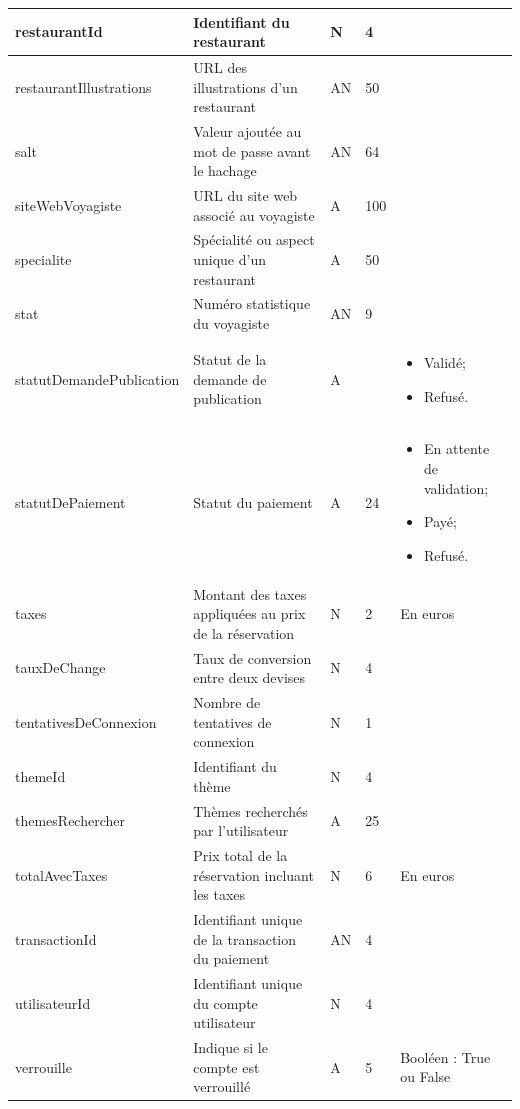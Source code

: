 \documentclass[12pt]{report}
\begin{document}
\begin{longtable}{|p{4cm}|p{4cm}|p{1cm}|p{1cm}|p{4cm}|}
				\hline
				restaurantId & Identifiant du restaurant & N & 4 & \\						
				\hline
				restaurantIllustrations & URL des illustrations d'un restaurant & AN & 50 & \\						
				\hline
				salt & Valeur ajoutée au mot de passe avant le hachage & AN & 64 & \\						
				\hline
				siteWebVoyagiste & URL du site web associé au voyagiste & A & 100 & \\						
				\hline
				specialite & Spécialité ou aspect unique d'un restaurant & A & 50 & \\						
				\hline
				stat & Numéro statistique du voyagiste & AN & 9 & \\						
				\hline
				statutDemandePublication & Statut de la demande de publication & A & &\begin{itemize} \item Validé; \item Refusé.	 \end{itemize}\\
				\hline
				statutDePaiement & Statut du paiement & A & 24 & \begin{itemize} \item En attente de validation; \item Payé; \item Refusé. \end{itemize} \\						
				\hline
				taxes & Montant des taxes appliquées au prix de la réservation & N & 2 & En euros \\						
				\hline
				tauxDeChange & Taux de conversion entre deux devises & N & 4 & \\						
				\hline
				tentativesDeConnexion & Nombre de tentatives de connexion & N & 1 & \\						
				\hline
				themeId & Identifiant du thème & N & 4 & \\						
				\hline
				themesRechercher & Thèmes recherchés par l'utilisateur & A & 25 & \\						
				\hline
				totalAvecTaxes & Prix total de la réservation incluant les taxes & N & 6 & En euros \\						
				\hline
				transactionId & Identifiant unique de la transaction du paiement & AN & 4 & \\						
				\hline
				utilisateurId & Identifiant unique du compte utilisateur & N & 4 & \\						
				\hline
				verrouille & Indique si le compte est verrouillé & A & 5 & Booléen : True ou False \\						

\end{longtable}
\end{document}
